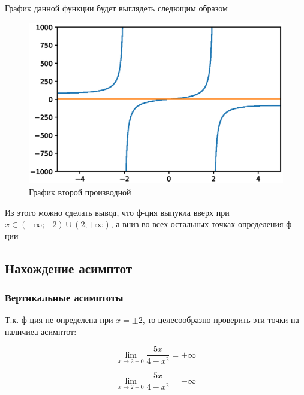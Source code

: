     График данной функции будет выглядеть следющим образом \cite{matplotlib}
    \begin{figure}[H]
        \centering
        \includegraphics[width=\textwidth]{fig/secDer.eps} 
        \caption{График второй производной}
        \label{fig:my_label}
    \end{figure}
    Из этого можно сделать вывод, что ф-ция выпукла вверх при \\ $x \in (-\infty;-2)\cup(2;+\infty)$, а вниз во всех остальных точках определения ф-ции
    
\subsection{Нахождение асимптот}
    \subsubsection{Вертикальные асимптоты}
        Т.к. ф-ция не определена при $x = \pm2$, то целесообразно проверить эти точки на наличиеа асимптот:
        
        \noindent\begin{minipage}{.5\linewidth}
        \begin{equation}
            \label{eq:eq4}
            \lim_{x \to 2-0} \frac{5x}{4-x^2}=+\infty
        \end{equation}
        \end{minipage}%
        \begin{minipage}{.5\linewidth}
        \begin{equation}
            \label{eq:eq5}
            \lim_{x \to 2+0} \frac{5x}{4-x^2}=-\infty
        \end{equation}
        \end{minipage}
        
